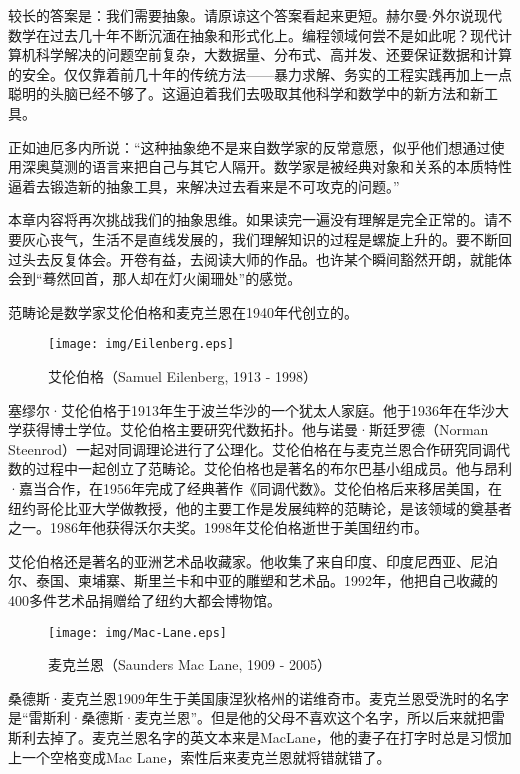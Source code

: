 \documentclass{article}
\begin{document}
较长的答案是：我们需要抽象。请原谅这个答案看起来更短。赫尔曼$\cdot$外尔说现代数学在过去几十年不断沉湎在抽象和形式化上。编程领域何尝不是如此呢？现代计算机科学解决的问题空前复杂，大数据量、分布式、高并发、还要保证数据和计算的安全。仅仅靠着前几十年的传统方法——暴力求解、务实的工程实践再加上一点聪明的头脑已经不够了。这逼迫着我们去吸取其他科学和数学中的新方法和新工具。

正如迪厄多内所说：“这种抽象绝不是来自数学家的反常意愿，似乎他们想通过使用深奥莫测的语言来把自己与其它人隔开。数学家是被经典对象和关系的本质特性逼着去锻造新的抽象工具，来解决过去看来是不可攻克的问题。”\cite{Dieudonne1987}

本章内容将再次挑战我们的抽象思维。如果读完一遍没有理解是完全正常的。请不要灰心丧气，生活不是直线发展的，我们理解知识的过程是螺旋上升的。要不断回过头去反复体会。开卷有益，去阅读大师的作品。也许某个瞬间豁然开朗，就能体会到“蓦然回首，那人却在灯火阑珊处”的感觉。

范畴论是数学家艾伦伯格和麦克兰恩在1940年代创立的。

\begin{wrapfigure}{R}{0.3\textwidth}
 \centering
 \texttt{[image: img/Eilenberg.eps]}
 \captionsetup{labelformat=empty}
 \caption{艾伦伯格（Samuel Eilenberg, 1913 - 1998）}
 \label{fig:Eilenberg}
\end{wrapfigure}

塞缪尔·艾伦伯格于1913年生于波兰华沙的一个犹太人家庭。他于1936年在华沙大学获得博士学位。艾伦伯格主要研究代数拓扑。他与诺曼·斯廷罗德（Norman Steenrod）一起对同调理论进行了公理化。艾伦伯格在与麦克兰恩合作研究同调代数的过程中一起创立了范畴论。艾伦伯格也是著名的布尔巴基小组成员。他与昂利·嘉当合作，在1956年完成了经典著作《同调代数》。艾伦伯格后来移居美国，在纽约哥伦比亚大学做教授，他的主要工作是发展纯粹的范畴论，是该领域的奠基者之一。1986年他获得沃尔夫奖。1998年艾伦伯格逝世于美国纽约市。

艾伦伯格还是著名的亚洲艺术品收藏家。他收集了来自印度、印度尼西亚、尼泊尔、泰国、柬埔寨、斯里兰卡和中亚的雕塑和艺术品。1992年，他把自己收藏的400多件艺术品捐赠给了纽约大都会博物馆\cite{Wiki-Eilenberg}。

\begin{wrapfigure}{L}{0.3\textwidth}
 \centering
 \texttt{[image: img/Mac-Lane.eps]}
 \captionsetup{labelformat=empty}
 \caption{麦克兰恩（Saunders Mac Lane, 1909 - 2005）}
 \label{fig:Mac-Lane}
\end{wrapfigure}

桑德斯·麦克兰恩1909年生于美国康涅狄格州的诺维奇市。麦克兰恩受洗时的名字是“雷斯利·桑德斯·麦克兰恩”。但是他的父母不喜欢这个名字，所以后来就把雷斯利去掉了。麦克兰恩名字的英文本来是MacLane，他的妻子在打字时总是习惯加上一个空格变成Mac Lane，索性后来麦克兰恩就将错就错了。
\end{document}
